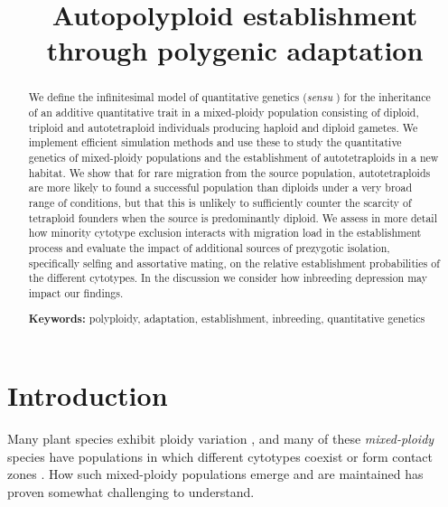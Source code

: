 \documentclass[12pt,a4paper]{article}
\begin{document}
\title{Autopolyploid establishment through polygenic adaptation}
\author{}
\date{\vspace{-5ex}}
\maketitle
\begin{abstract}
We define the infinitesimal model of quantitative genetics (\textit{sensu}
    \cite{barton2017}) for the inheritance of an additive quantitative trait in
    a mixed-ploidy population consisting of diploid, triploid and
    autotetraploid individuals producing haploid and diploid gametes.  We
    implement efficient simulation methods and use these to study the
    quantitative genetics of mixed-ploidy populations and the establishment of
    autotetraploids in a new habitat.  We show that for rare migration from the
    source population, autotetraploids are more likely to found a successful
    population than diploids under a very broad range of conditions, but that
    this is unlikely to sufficiently counter the scarcity of tetraploid
    founders when the source is predominantly diploid.  We assess in more
    detail how minority cytotype exclusion interacts with migration load in the
    establishment process and evaluate the impact of additional sources of
    prezygotic isolation, specifically selfing and assortative mating, on the
    relative establishment probabilities of the different cytotypes.
    In the discussion we consider how inbreeding depression may impact our
    findings.

    \textbf{Keywords:} polyploidy, adaptation, establishment, inbreeding,
    quantitative genetics 
\end{abstract}

\section*{Introduction}


Many plant species exhibit ploidy variation
\citep{levin2002,soltis2007,rice2015}, and many of these \textit{mixed-ploidy}
species have populations in which different cytotypes coexist or form contact
zones \citep{kolar2017}.
How such mixed-ploidy populations emerge and are maintained has proven somewhat
challenging to understand.
\end{document}
